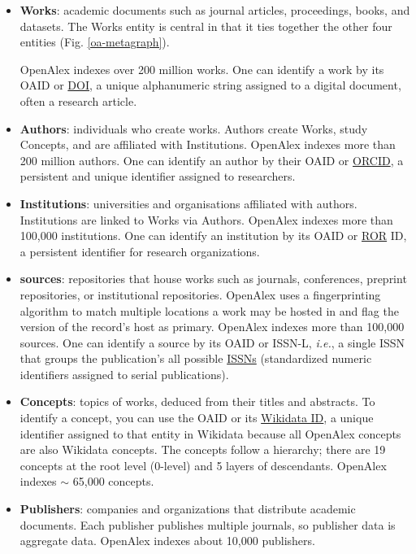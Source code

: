 \begin{itemize}
\item \textbf{Works}: academic documents such as journal articles, proceedings, books, and datasets.
The Works entity is central in that it ties together the other four entities (Fig. \ref{oa-metagraph}).

OpenAlex indexes over 200 million works.
One can identify a work by its OAID or \href{https://www.doi.org/}{DOI}, a unique alphanumeric string assigned to a digital document, often a research article.

\item \textbf{Authors}: individuals who create works.
Authors create Works, study Concepts, and are affiliated with Institutions.
OpenAlex indexes more than 200 million authors.
One can identify an author by their OAID or \href{https://orcid.org/}{ORCID}, a persistent and unique identifier assigned to researchers.

\item \textbf{Institutions}: universities and organisations affiliated with authors.
Institutions are linked to Works via Authors.
OpenAlex indexes more than 100,000 institutions.
One can identify an institution by its OAID or \href{https://ror.org/}{ROR} ID, a persistent identifier for research organizations.

\item \textbf{sources}: repositories that house works such as journals, conferences, preprint repositories, or institutional repositories.
OpenAlex uses a fingerprinting algorithm to match multiple locations a work may be hosted in and flag the version of the record's host as primary.
OpenAlex indexes more than 100,000 sources.
One can identify a source by its OAID or ISSN-L, \emph{i.e.}, a single ISSN that groups the publication's all possible \href{https://www.issn.org/}{ISSNs} (standardized numeric identifiers assigned to serial publications).

\item \textbf{Concepts}: topics of works, deduced from their titles and abstracts.
To identify a concept, you can use the OAID or its \href{https://www.wikidata.org/wiki/Wikidata:Identifiers}{Wikidata ID}, a unique identifier assigned to that entity in Wikidata because all OpenAlex concepts are also Wikidata concepts.
The concepts follow a hierarchy; there are 19 concepts at the root level (0-level) and 5 layers of descendants. 
OpenAlex indexes $\sim$ 65,000 concepts.

\item \textbf{Publishers}: companies and organizations that distribute academic documents. Each publisher publishes multiple journals, so publisher data is aggregate data. OpenAlex indexes about 10,000 publishers.


\end{itemize}
